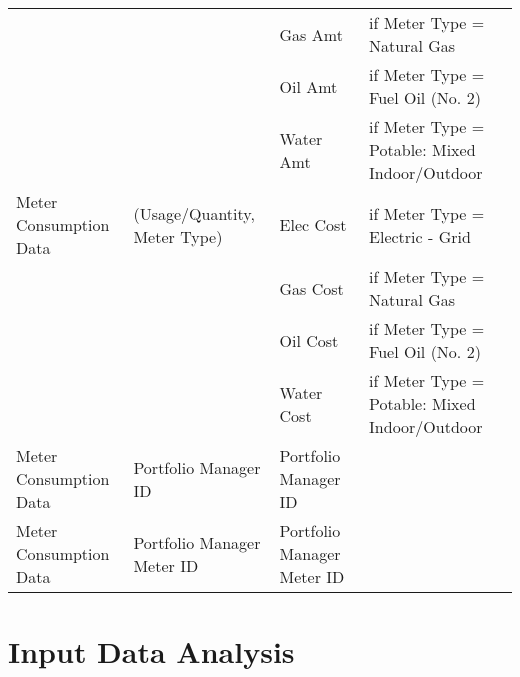\documentclass[12pt]{article}
\begin{document}
\begin{table}[h!]
\begin{tabular}{p{3cm}p{3cm}|p{3cm}|p{5cm}}
  \cline{3-4}
                       &                              & Gas Amt                     & if Meter Type = Natural Gas\\
  \cline{3-4}
                       &                              & Oil Amt                     & if Meter Type = Fuel Oil (No. 2)\\
  \cline{3-4}
                       &                              & Water Amt                   & if Meter Type = Potable: Mixed Indoor/Outdoor\\
  \hline
Meter Consumption Data & (Usage/Quantity, Meter Type) & Elec Cost                    & if Meter Type = Electric - Grid\\
  \cline{3-4}
                       &                              & Gas Cost                     & if Meter Type = Natural Gas\\
  \cline{3-4}
                       &                              & Oil Cost                     & if Meter Type = Fuel Oil (No. 2)\\
  \cline{3-4}
                       &                              & Water Cost                   & if Meter Type = Potable: Mixed Indoor/Outdoor\\
  \hline
Meter Consumption Data & Portfolio Manager ID         & Portfolio Manager ID        &                             \\
  \hline
Meter Consumption Data & Portfolio Manager Meter ID   & Portfolio Manager Meter ID  &                             \\
  \hline
  \hline
\end{tabular}
\end{table}
\section{Input Data Analysis}
\end{document}
